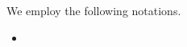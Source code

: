 \documentclass[a4paper,dvipsnames, 11pt]{amsart} %
\begin{document}
\maketitle
\begin{notation}
	We employ the following notations.
	\begin{itemize}
		\item %
	\end{itemize}
\end{notation}


\end{document}
